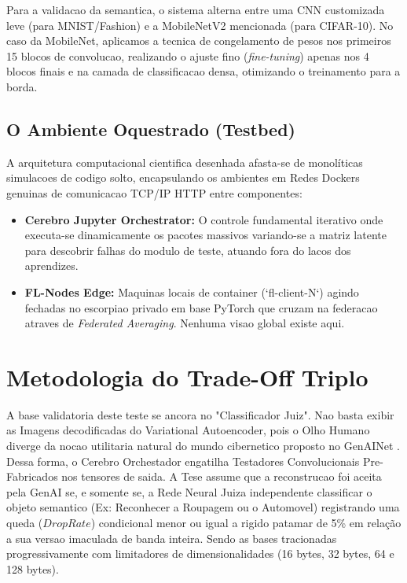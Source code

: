 \documentclass[conference]{IEEEtran}
\begin{document}
Para a validacao da semantica, o sistema alterna entre uma CNN customizada leve (para MNIST/Fashion) e a MobileNetV2 mencionada (para CIFAR-10). No caso da MobileNet, aplicamos a tecnica de congelamento de pesos nos primeiros 15 blocos de convolucao, realizando o ajuste fino (\textit{fine-tuning}) apenas nos 4 blocos finais e na camada de classificacao densa, otimizando o treinamento para a borda.

\subsection{O Ambiente Oquestrado (Testbed)}

A arquitetura computacional cientifica desenhada afasta-se de monolíticas simulacoes de codigo solto, encapsulando os ambientes em Redes Dockers genuinas de comunicacao TCP/IP HTTP entre componentes:
\begin{itemize}
    \item \textbf{Cerebro Jupyter Orchestrator:} O controle fundamental iterativo onde executa-se dinamicamente os pacotes massivos variando-se a matriz latente para descobrir falhas do modulo de teste, atuando fora do lacos dos aprendizes.
    \item \textbf{FL-Nodes Edge:} Maquinas locais de container (`fl-client-N`) agindo fechadas no escorpiao privado em base PyTorch que cruzam na federacao atraves de \textit{Federated Averaging}. Nenhuma visao global existe aqui.
\end{itemize}


\section{Metodologia do Trade-Off Triplo}

A base validatoria deste teste se ancora no "Classificador Juiz". Nao basta exibir as Imagens decodificadas do Variational Autoencoder, pois o Olho Humano diverge da nocao utilitaria natural do mundo cibernetico proposto no GenAINet \cite{du2023genainet}.
Dessa forma, o Cerebro Orchestador engatilha Testadores Convolucionais Pre-Fabricados nos tensores de saida. 
A Tese assume que a reconstrucao foi aceita pela GenAI se, e somente se, a Rede Neural Juiza independente classificar o objeto semantico (Ex: Reconhecer a Roupagem ou o Automovel) registrando uma queda ($Drop Rate$) condicional menor ou igual a rigido patamar de 5\% em relação a sua versao imaculada de banda inteira.
Sendo as bases tracionadas progressivamente com limitadores de dimensionalidades (16 bytes, 32 bytes, 64 e 128 bytes).
\end{document}
